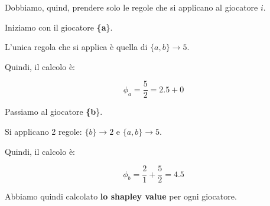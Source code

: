 Dobbiamo, quind, prendere solo le regole che si applicano al giocatore $i$.

Iniziamo con il giocatore \textbf{\{a}\}.

L'unica regola che si applica è quella di $\{a,b\} \rightarrow 5$.

Quindi, il calcolo è:

\[
    \phi_a = \frac{5}{2} = 2.5  + 0
\]

Passiamo al giocatore \textbf{\{b}\}.

Si applicano 2 regole: $\{b\} \rightarrow 2$ e $\{a,b\} \rightarrow 5$.

Quindi, il calcolo è:

\[
    \phi_b = \frac{2}{1} + \frac{5}{2} = 4.5
\]

Abbiamo quindi calcolato \textbf{lo shapley value} per ogni giocatore.